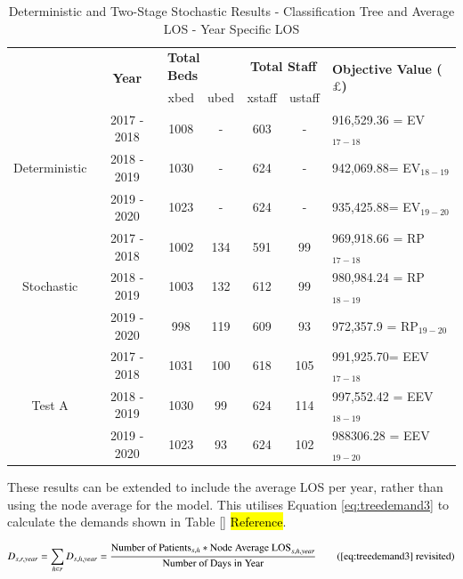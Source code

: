 \documentclass[../thesis.tex]{subfiles}
\begin{document}
\begin{table}[h!]
    \centering
    \begin{tabular}{ccccccl}\toprule
 & \multirow{2}{*}{\textbf{Year}}& \multicolumn{2}{l}{\textbf{Total Beds}} & \multicolumn{2}{c}{\textbf{Total Staff}} & \multirow{2}{*}{\textbf{Objective Value ($\pounds$)}}\\ \cmidrule(lr){3-4} \cmidrule(lr){5-6}
&& xbed           & ubed          & xstaff         & ustaff         \\ \midrule
     \multirow{3}{*}{Deterministic} & 2017 - 2018 & 1008  & - & 603 & - & 916,529.36 =  EV$_{17-18}$ \\ 
      & 2018 - 2019 & 1030& - & 624  & - &  942,069.88=  EV$_{18-19}$ \\
      & 2019 - 2020 & 1023  & - & 624 & - &   935,425.88=  EV$_{19-20}$\\ \midrule
     \multirow{3}{*}{Stochastic} & 2017 - 2018 & 1002 & 134 &591  & 99 &  969,918.66 =  RP$_{17-18}$ \\ 
      & 2018 - 2019 & 1003  &  132 & 612 & 99 &980,984.24  =  RP$_{18-19}$ \\
      & 2019 - 2020 &998 &119  &609 &93 &  972,357.9
=  RP$_{19-20}$\\ \midrule    
     \multirow{3}{*}{Test A} & 2017 - 2018 & 1031 & 100 & 618  &105  & 991,925.70=  EEV$_{17-18}$ \\ 
      & 2018 - 2019& 1030 & 99 &  624& 114 & 997,552.42
=  EEV$_{18-19}$ \\
      & 2019 - 2020 & 1023 & 93  & 624 &102 &  988306.28
=  EEV$_{19-20}$\\ \bottomrule       
    \end{tabular}
    \caption{Deterministic and Two-Stage Stochastic Results - Classification Tree and Average LOS - Year Specific LOS}
    \label{tab:Results7}
\end{table}



These results can be extended to include the average LOS per year, rather than using the node average for the model. This utilises Equation \eqref{eq:treedemand3} to calculate the demands shown in Table \ref{} \hl{Reference}.

\begin{equation}
        D_{s,r,year} = \sum\limits_{h \in r} D_{s,h,year} = \frac{\text{Number of Patients}_{s,h}*\text{Node Average LOS}_{s,h,year}}{\text{Number of Days in Year}} \tag{\ref{eq:treedemand3} revisited}
\end{equation}
\end{document}
